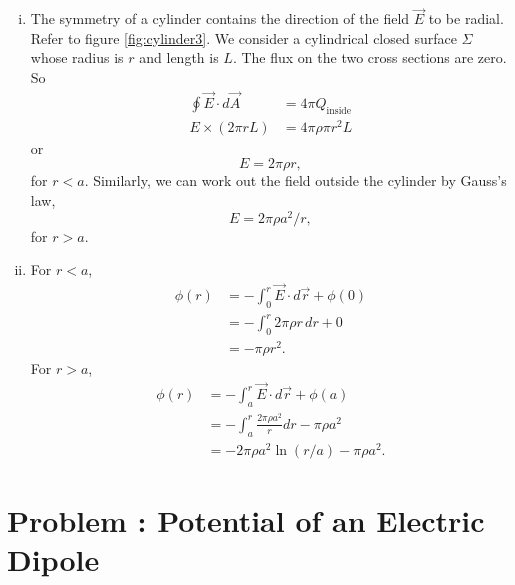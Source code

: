 \documentclass[solutions]{esg8022pset}
\begin{document}
\begin{enumerate}[(a)]
    \begin{enumerate}[(i)]
      \item The symmetry of a cylinder contains the direction of the field
        $\vec{E}$ to be radial.  Refer to figure \ref{fig:cylinder3}.  We
        consider a cylindrical closed surface $\Sigma$ whose radius is $r$ and
        length is $L$.  The flux on the two cross sections are zero.  So
        \begin{align*}
          \oint \vec{E}\cdot d\vec{A} & = 4\pi Q_{\text{inside}}\\
          E\times(2\pi rL) & = 4\pi\rho\pi r^2L
        \end{align*}
        or
        \begin{equation*}
        E=2\pi\rho r,
        \end{equation*}
        for $r<a$.  Similarly, we can work out the field outside the cylinder
        by Gauss's law,
        \begin{equation*}
        E=2\pi\rho a^2/r,
        \end{equation*}
        for $r>a$.
      \item For $r<a$,
        \begin{align*}
          \phi(r) & = -\int_0^r\vec{E}\cdot d\vec{r}+\phi(0)\\
                  & = -\int_0^r 2\pi\rho r\,dr+0\\
                  & = -\pi\rho r^2.
        \end{align*}
        For $r>a$,
        \begin{align*}
          \phi(r) & = -\int_a^r \vec{E}\cdot d\vec{r}+\phi(a)\\
                  & = -\int_a^r\frac{2\pi\rho a^2}{r}dr-\pi\rho a^2\\
                  & = -2\pi\rho a^2\ln{(r/a)}-\pi\rho a^2.
        \end{align*}
    \end{enumerate}
  \end{enumerate}
\section{Problem \thesection: Potential of an Electric Dipole}
\end{document}
